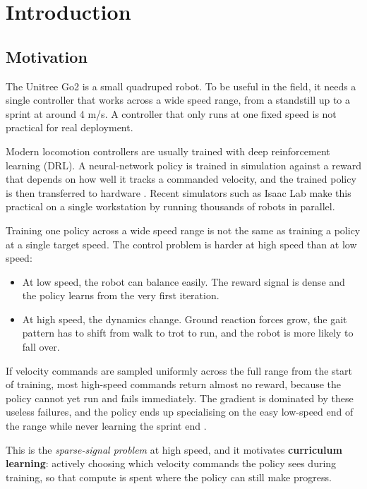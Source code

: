 \section{Introduction}

\subsection{Motivation}

The Unitree Go2 is a small quadruped robot. To be useful in the field, it needs a single controller that works across a wide speed range, from a standstill up to a sprint at around 4 m/s. A controller that only runs at one fixed speed is not practical for real deployment.

Modern locomotion controllers are usually trained with deep reinforcement learning (DRL). A neural-network policy is trained in simulation against a reward that depends on how well it tracks a commanded velocity, and the trained policy is then transferred to hardware \cite{rudin2022}. Recent simulators such as Isaac Lab \cite{mittal2023} make this practical on a single workstation by running thousands of robots in parallel.

Training one policy across a wide speed range is not the same as training a policy at a single target speed. The control problem is harder at high speed than at low speed:
\begin{itemize}
  \item At low speed, the robot can balance easily. The reward signal is dense and the policy learns from the very first iteration.
  \item At high speed, the dynamics change. Ground reaction forces grow, the gait pattern has to shift from walk to trot to run, and the robot is more likely to fall over.
\end{itemize}

If velocity commands are sampled uniformly across the full range from the start of training, most high-speed commands return almost no reward, because the policy cannot yet run and fails immediately. The gradient is dominated by these useless failures, and the policy ends up specialising on the easy low-speed end of the range while never learning the sprint end \cite{margolis2022}.

This is the \textit{sparse-signal problem} at high speed, and it motivates \textbf{curriculum learning}: actively choosing which velocity commands the policy sees during training, so that compute is spent where the policy can still make progress.

